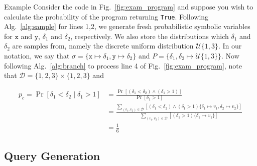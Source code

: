 \documentclass[acmsmall,review]{acmart}\settopmatter{}
\begin{document}
	\begin{paragraph}{Example}
		Consider the code in Fig.~\ref{fig:exam_program} and suppose you wish to calculate the probability of the program returning \texttt{True}.
		Following Alg.~\ref{alg:sample} for lines 1,2, we generate fresh probabilistic symbolic variables for $\mathtt{x}$ and $\mathtt{y}$, $\delta_1$ and $\delta_2$, respectively.
		We also store the distributions which $\delta_1$ and $\delta_2$ are samples from, namely the discrete uniform distribution $\mathcal{U}\{1,3\}$.
		In our notation, we say that $\sigma = \{ \mathtt{x} \mapsto \delta_1, \mathtt{y} \mapsto \delta_2 \}$ and $P = \{ \delta_1,\delta_2 \mapsto \mathcal{U}\{1,3\} \}$.
		Now following Alg.~\ref{alg:branch} to process line 4 of Fig.~\ref{fig:exam_program}, note that $\mathcal{D} = \{1,2,3\} \times \{1,2,3\}$ and 
		
		\begin{align*}
			p_c = \Pr[\delta_1 < \delta_2 \mid \delta_1 > 1] &= \frac{\Pr[(\delta_1 < \delta_2) \wedge (\delta_1 > 1)]}{\Pr[\delta_1 > 1]}\\
			&= \frac{\displaystyle\sum_{(v_1,v_2) \in \mathcal{D}} [(\delta_1 < \delta_2) \wedge (\delta_1 > 1)\{\delta_1 \mapsto v_1, \delta_2 \mapsto v_2\}]}{\displaystyle\sum_{(v_1,v_2) \in \mathcal{D}} [(\delta_1 > 1)\{\delta_1 \mapsto v_1\}]}\\
			&= \frac{1}{6}
		\end{align*}
	\end{paragraph}
	
	\subsection{Query Generation}
	\label{sec:query_gen}
	
\end{document}
